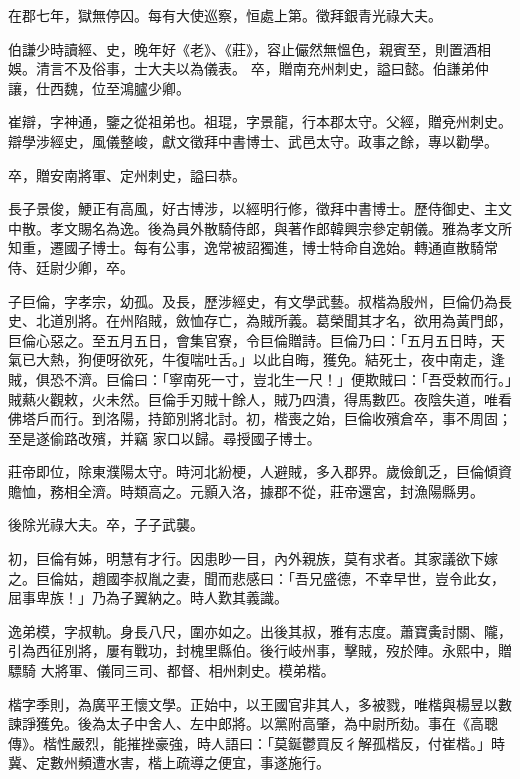 \begin{pinyinscope}
 在郡七年，獄無停囚。每有大使巡察，恒處上第。徵拜銀青光祿大夫。



 伯謙少時讀經、史，晚年好《老》、《莊》，容止儼然無慍色，親賓至，則置酒相娛。清言不及俗事，士大夫以為儀表。
 卒，贈南充州刺史，謚曰懿。伯謙弟仲讓，仕西魏，位至鴻臚少卿。



 崔辯，字神通，鑒之從祖弟也。祖琨，字景龍，行本郡太守。父經，贈兗州刺史。辯學涉經史，風儀整峻，獻文徵拜中書博士、武邑太守。政事之餘，專以勸學。



 卒，贈安南將軍、定州刺史，謚曰恭。



 長子景俊，鯁正有高風，好古博涉，以經明行修，徵拜中書博士。歷侍御史、主文中散。孝文賜名為逸。後為員外散騎侍郎，與著作郎韓興宗參定朝儀。雅為孝文所知重，遷國子博士。每有公事，逸常被詔獨進，博士特命自逸始。轉通直散騎常侍、廷尉少卿，卒。



 子巨倫，字孝宗，幼孤。及長，歷涉經史，有文學武藝。叔楷為殷州，巨倫仍為長史、北道別將。在州陷賊，斂恤存亡，為賊所義。葛榮聞其才名，欲用為黃門郎，巨倫心惡之。至五月五日，會集官寮，令巨倫贈詩。巨倫乃曰：「五月五日時，天氣已大熱，狗便呀欲死，牛復喘吐舌。」以此自晦，獲免。結死士，夜中南走，逢賊，俱恐不濟。巨倫曰：「寧南死一寸，豈北生一尺！」便欺賊曰：「吾受敕而行。」賊爇火觀敕，火未然。巨倫手刃賊十餘人，賊乃四潰，得馬數匹。夜陰失道，唯看佛塔戶而行。到洛陽，持節別將北討。初，楷喪之始，巨倫收殯倉卒，事不周固；至是遂偷路改殯，并竊
 家口以歸。尋授國子博士。



 莊帝即位，除東濮陽太守。時河北紛梗，人避賊，多入郡界。歲儉飢乏，巨倫傾資贍恤，務相全濟。時類高之。元顥入洛，據郡不從，莊帝還宮，封漁陽縣男。



 後除光祿大夫。卒，子子武襲。



 初，巨倫有姊，明慧有才行。因患眇一目，內外親族，莫有求者。其家議欲下嫁之。巨倫姑，趙國李叔胤之妻，聞而悲感曰：「吾兄盛德，不幸早世，豈令此女，屈事卑族！」乃為子翼納之。時人歎其義識。



 逸弟模，字叔軌。身長八尺，圍亦如之。出後其叔，雅有志度。蕭寶夤討關、隴，引為西征別將，屢有戰功，封槐里縣伯。後行岐州事，擊賊，歿於陣。永熙中，贈驃騎
 大將軍、儀同三司、都督、相州刺史。模弟楷。



 楷字季則，為廣平王懷文學。正始中，以王國官非其人，多被戮，唯楷與楊昱以數諫諍獲免。後為太子中舍人、左中郎將。以黨附高肇，為中尉所劾。事在《高聰傳》。楷性嚴烈，能摧挫豪強，時人語曰：「莫鋋鬱買反彳解孤楷反，付崔楷。」時冀、定數州頻遭水害，楷上疏導之便宜，事遂施行。




\end{pinyinscope}
